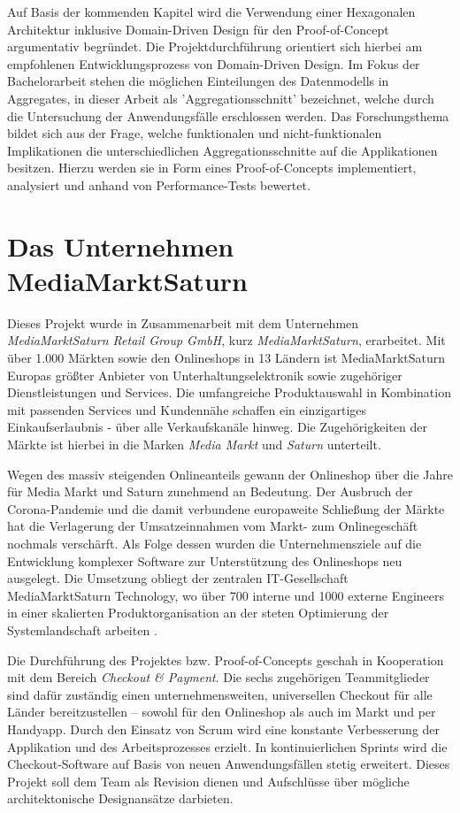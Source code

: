 Auf Basis der kommenden Kapitel wird die Verwendung einer Hexagonalen Architektur inklusive Domain-Driven Design für den Proof-of-Concept argumentativ begründet. Die Projektdurchführung orientiert sich hierbei am empfohlenen Entwicklungsprozess von Domain-Driven Design. Im Fokus der Bachelorarbeit stehen die möglichen Einteilungen des Datenmodells in Aggregates, in dieser Arbeit als 'Aggregationsschnitt' bezeichnet, welche durch die Untersuchung der Anwendungsfälle erschlossen werden. Das Forschungsthema bildet sich aus der Frage, welche funktionalen und nicht-funktionalen Implikationen die unterschiedlichen Aggregationsschnitte auf die Applikationen besitzen. Hierzu werden sie in Form eines Proof-of-Concepts implementiert, analysiert und anhand von Performance-Tests bewertet.

\section{Das Unternehmen MediaMarktSaturn}

Dieses Projekt wurde in Zusammenarbeit mit dem Unternehmen \emph{MediaMarktSaturn Retail Group GmbH}, kurz \emph{MediaMarktSaturn}, erarbeitet. Mit über 1.000 Märkten sowie den Onlineshops in 13 Ländern ist MediaMarktSaturn Europas größter Anbieter von Unterhaltungselektronik sowie zugehöriger Dienstleistungen und Services. Die umfangreiche Produktauswahl in Kombination mit passenden Services und Kundennähe schaffen ein einzigartiges Einkaufserlaubnis - über alle Verkaufskanäle hinweg. Die Zugehörigkeiten der Märkte ist hierbei in die Marken \emph{Media Markt} und \emph{Saturn} unterteilt. \cite{mms.Unternehmen}

Wegen des massiv steigenden Onlineanteils gewann der Onlineshop über die Jahre für Media Markt und Saturn zunehmend an Bedeutung. Der Ausbruch der Corona-Pandemie und die damit verbundene europaweite Schließung der Märkte hat die Verlagerung der Umsatzeinnahmen vom Markt- zum Onlinegeschäft nochmals verschärft. Als Folge dessen wurden die Unternehmensziele auf die Entwicklung komplexer Software zur Unterstützung des Onlineshops neu ausgelegt. Die Umsetzung obliegt der zentralen IT-Gesellschaft MediaMarktSaturn Technology, wo über 700 interne und 1000 externe Engineers in einer skalierten Produktorganisation an der steten Optimierung der Systemlandschaft arbeiten \cite{mms.technology}.

Die Durchführung des Projektes bzw. Proof-of-Concepts geschah in Kooperation mit dem Bereich \emph{Checkout \& Payment}. Die sechs zugehörigen Teammitglieder sind dafür zuständig einen unternehmensweiten, universellen Checkout für alle Länder bereitzustellen – sowohl für den Onlineshop als auch im Markt und per Handyapp. Durch den Einsatz von \Gls{Scrum} wird eine konstante Verbesserung der Applikation und des Arbeitsprozesses erzielt. In kontinuierlichen \Glspl{Sprint} wird die Checkout-Software auf Basis von neuen Anwendungsfällen stetig erweitert. Dieses Projekt soll dem Team als Revision dienen und Aufschlüsse über mögliche architektonische Designansätze darbieten.


